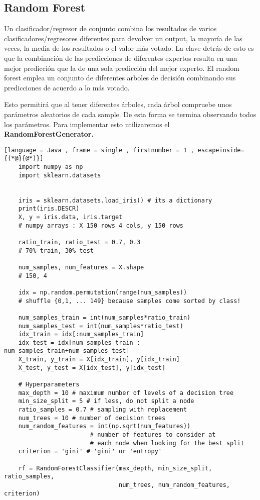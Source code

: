 \documentclass[11pt]{article}
\theoremstyle{plain}
\begin{document}
        \subsection{Random Forest} %
        \label{sub:random_forest}
            Un clasificador/regresor de conjunto combina los resultados de varios clasificadores/regresores diferentes para devolver un output, la mayoría de las veces, la media de los resultados o el valor más votado. La clave detrás de esto es que la combinación de las predicciones de diferentes expertos resulta en una mejor predicción que la de una sola predicción del mejor experto. El random forest emplea un conjunto de diferentes arboles de decisión combinando sus predicciones de acuerdo a lo más votado.

            Esto permitirá que al tener diferentes árboles, cada árbol compruebe unos parámetros aleatorios de cada sample. De esta forma se termina observando todos los parámetros. Para implementar esto utilizaremos el \textbf{RandomForestGenerator.}
            \begin{lstlisting}[language = Java , frame = single , firstnumber = 1 , escapeinside={(*@}{@*)}]
    import numpy as np
    import sklearn.datasets


    iris = sklearn.datasets.load_iris() # its a dictionary
    print(iris.DESCR)
    X, y = iris.data, iris.target
    # numpy arrays : X 150 rows 4 cols, y 150 rows

    ratio_train, ratio_test = 0.7, 0.3
    # 70% train, 30% test

    num_samples, num_features = X.shape
    # 150, 4

    idx = np.random.permutation(range(num_samples))
    # shuffle {0,1, ... 149} because samples come sorted by class!

    num_samples_train = int(num_samples*ratio_train)
    num_samples_test = int(num_samples*ratio_test)
    idx_train = idx[:num_samples_train]
    idx_test = idx[num_samples_train : num_samples_train+num_samples_test]
    X_train, y_train = X[idx_train], y[idx_train]
    X_test, y_test = X[idx_test], y[idx_test]

    # Hyperparameters
    max_depth = 10 # maximum number of levels of a decision tree
    min_size_split = 5 # if less, do not split a node
    ratio_samples = 0.7 # sampling with replacement
    num_trees = 10 # number of decision trees
    num_random_features = int(np.sqrt(num_features))
                        # number of features to consider at
                        # each node when looking for the best split
    criterion = 'gini' # 'gini' or 'entropy'

    rf = RandomForestClassifier(max_depth, min_size_split, ratio_samples,
                                num_trees, num_random_features, criterion)
            \end{lstlisting}
\end{document}
